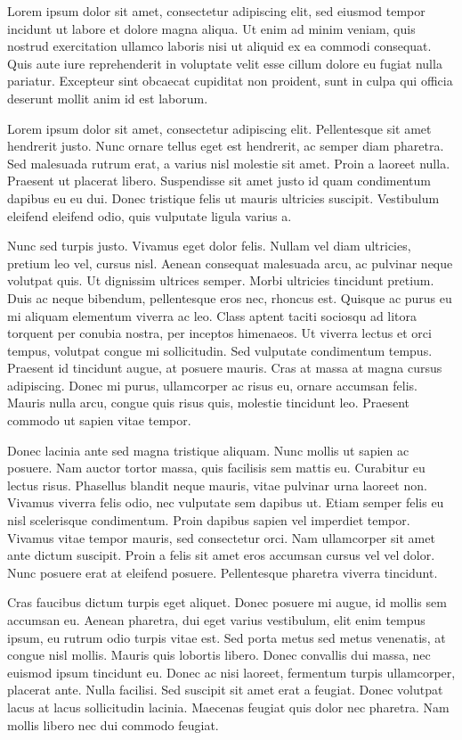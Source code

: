 \documentclass[11pt,a4paper]{report}
\begin{document}
Lorem ipsum dolor sit amet, consectetur adipiscing elit, sed eiusmod tempor incidunt ut labore et dolore magna aliqua. Ut enim ad minim veniam, quis nostrud exercitation ullamco laboris nisi ut aliquid ex ea commodi consequat. Quis aute iure reprehenderit in voluptate velit esse cillum dolore eu fugiat nulla pariatur. Excepteur sint obcaecat cupiditat non proident, sunt in culpa qui officia deserunt mollit anim id est laborum.


Lorem ipsum dolor sit amet, consectetur adipiscing elit. Pellentesque sit amet hendrerit justo. Nunc ornare tellus eget est hendrerit, ac semper diam pharetra. Sed malesuada rutrum erat, a varius nisl molestie sit amet. Proin a laoreet nulla. Praesent ut placerat libero. Suspendisse sit amet justo id quam condimentum dapibus eu eu dui. Donec tristique felis ut mauris ultricies suscipit. Vestibulum eleifend eleifend odio, quis vulputate ligula varius a.

Nunc sed turpis justo. Vivamus eget dolor felis. Nullam vel diam ultricies, pretium leo vel, cursus nisl. Aenean consequat malesuada arcu, ac pulvinar neque volutpat quis. Ut dignissim ultrices semper. Morbi ultricies tincidunt pretium. Duis ac neque bibendum, pellentesque eros nec, rhoncus est. Quisque ac purus eu mi aliquam elementum viverra ac leo. Class aptent taciti sociosqu ad litora torquent per conubia nostra, per inceptos himenaeos. Ut viverra lectus et orci tempus, volutpat congue mi sollicitudin. Sed vulputate condimentum tempus. Praesent id tincidunt augue, at posuere mauris. Cras at massa at magna cursus adipiscing. Donec mi purus, ullamcorper ac risus eu, ornare accumsan felis. Mauris nulla arcu, congue quis risus quis, molestie tincidunt leo. Praesent commodo ut sapien vitae tempor.

Donec lacinia ante sed magna tristique aliquam. Nunc mollis ut sapien ac posuere. Nam auctor tortor massa, quis facilisis sem mattis eu. Curabitur eu lectus risus. Phasellus blandit neque mauris, vitae pulvinar urna laoreet non. Vivamus viverra felis odio, nec vulputate sem dapibus ut. Etiam semper felis eu nisl scelerisque condimentum. Proin dapibus sapien vel imperdiet tempor. Vivamus vitae tempor mauris, sed consectetur orci. Nam ullamcorper sit amet ante dictum suscipit. Proin a felis sit amet eros accumsan cursus vel vel dolor. Nunc posuere erat at eleifend posuere. Pellentesque pharetra viverra tincidunt.

Cras faucibus dictum turpis eget aliquet. Donec posuere mi augue, id mollis sem accumsan eu. Aenean pharetra, dui eget varius vestibulum, elit enim tempus ipsum, eu rutrum odio turpis vitae est. Sed porta metus sed metus venenatis, at congue nisl mollis. Mauris quis lobortis libero. Donec convallis dui massa, nec euismod ipsum tincidunt eu. Donec ac nisi laoreet, fermentum turpis ullamcorper, placerat ante. Nulla facilisi. Sed suscipit sit amet erat a feugiat. Donec volutpat lacus at lacus sollicitudin lacinia. Maecenas feugiat quis dolor nec pharetra. Nam mollis libero nec dui commodo feugiat.
\end{document}
